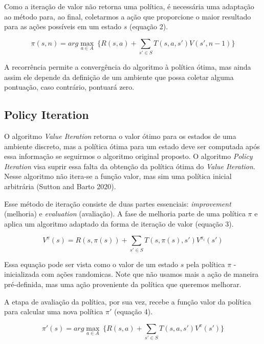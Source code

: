 \documentclass[letterpaper]{article} %
\begin{document}
Como a iteração de valor não retorna uma política, é necessária uma adaptação ao método para, ao final, coletarmos a ação que proporcione o maior resultado para as ações possíveis em um estado $s$ (equação 2).

\begin{equation}
\pi(s, n) = arg \max_{a \in A} \ \{ R(s,a) + \sum_{s' \in S} T(s,a,s')  V(s', n-1)\}
\end{equation}


A recorrência permite a convergência do algoritmo à política ótima, mas ainda assim ele depende da definição de um ambiente que possa coletar alguma pontuação, caso contrário, pontuará zero. 

\subsection{Policy Iteration}
O algoritmo \textit{Value Iteration} retorna o valor ótimo para os estados de uma ambiente discreto, mas a política ótima para um estado deve ser computada após essa informação se seguirmos o algoritmo original proposto. O algoritmo \textit{Policy Iteration} visa suprir essa falta da obtenção da política ótima do \textit{Value Iteration}. Nesse algoritmo não itera-se a função valor, mas sim uma política inicial arbitrária (Sutton and Barto 2020).

Esse método de iteração consiste de duas partes essenciais: \textit{improvement} (melhoria) e \textit{evaluation} (avaliação). A fase de melhoria parte de uma política $\pi$ e aplica um algoritmo adaptado da forma de iteração de valor (equação 3).

\begin{equation}
V^{\pi}(s) = R(s,\pi(s)) + \sum_{s' \in S} T(s,\pi(s),s')  V^{\pi_i}(s')
\end{equation}

Essa equação pode ser vista como o valor de um estado $s$ pela política $\pi$ - inicializada com ações randomicas. Note que não usamos mais a ação de maneira pré-definida, mas uma ação proveniente da política que queremos melhorar.

A etapa de avaliação da política, por sua vez, recebe a função valor da política para calcular uma nova política $\pi'$ (equação 4).

\begin{equation}
\pi'(s) = arg \max_{a \in A} \ \{ R(s,a) + \sum_{s' \in S} T(s,a,s')  V^{\pi}(s')\}
\end{equation}
\end{document}

